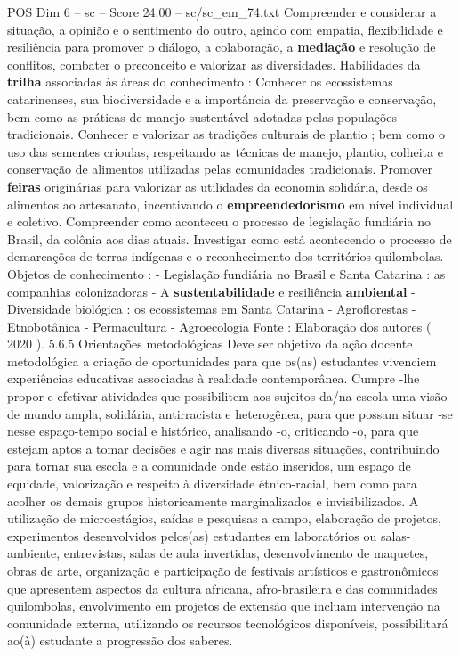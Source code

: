 \begin{textsample}{POS Dim 6 – sc – Score 24.00 – sc/sc\_em\_74.txt}
Compreender e considerar a situação, a opinião e o sentimento do outro, agindo com empatia, flexibilidade e resiliência para promover o diálogo, a colaboração, a \textbf{mediação} e resolução de conflitos, combater o preconceito e valorizar as diversidades.
Habilidades da \textbf{trilha} associadas às áreas do conhecimento : Conhecer os ecossistemas catarinenses, sua biodiversidade e a importância da preservação e conservação, bem como as práticas de manejo sustentável adotadas pelas populações tradicionais.
Conhecer e valorizar as tradições culturais de plantio ; bem como o uso das sementes crioulas, respeitando as técnicas de manejo, plantio, colheita e conservação de alimentos utilizadas pelas comunidades tradicionais.
Promover \textbf{feiras} originárias para valorizar as utilidades da economia solidária, desde os alimentos ao artesanato, incentivando o \textbf{empreendedorismo} em nível individual e coletivo.
Compreender como aconteceu o processo de legislação fundiária no Brasil, da colônia aos dias atuais.
Investigar como está acontecendo o processo de demarcações de terras indígenas e o reconhecimento dos territórios quilombolas.
Objetos de conhecimento : - Legislação fundiária no Brasil e Santa Catarina : as companhias colonizadoras - A \textbf{sustentabilidade} e resiliência \textbf{ambiental} - Diversidade biológica : os ecossistemas em Santa Catarina - Agroflorestas - Etnobotânica - Permacultura - Agroecologia Fonte : Elaboração dos autores ( 2020 ). 5.6.5 Orientações metodológicas Deve ser objetivo da ação docente metodológica a criação de oportunidades para que os(as) estudantes vivenciem experiências educativas associadas à realidade contemporânea.
Cumpre -lhe propor e efetivar atividades que possibilitem aos sujeitos da/na escola uma visão de mundo ampla, solidária, antirracista e heterogênea, para que possam situar -se nesse espaço-tempo social e histórico, analisando -o, criticando -o, para que estejam aptos a tomar decisões e agir nas mais diversas situações, contribuindo para tornar sua escola e a comunidade onde estão inseridos, um espaço de equidade, valorização e respeito à diversidade étnico-racial, bem como para acolher os demais grupos historicamente marginalizados e invisibilizados.
A utilização de microestágios, saídas e pesquisas a campo, elaboração de projetos, experimentos desenvolvidos pelos(as) estudantes em laboratórios ou salas-ambiente, entrevistas, salas de aula invertidas, desenvolvimento de maquetes, obras de arte, organização e participação de festivais artísticos e gastronômicos que apresentem aspectos da cultura africana, afro-brasileira e das comunidades quilombolas, envolvimento em projetos de extensão que incluam intervenção na comunidade externa, utilizando os recursos tecnológicos disponíveis, possibilitará ao(à) estudante a progressão dos saberes.

\end{textsample}
